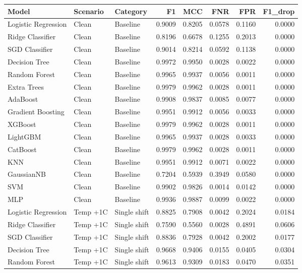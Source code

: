 \begin{tabular}{lllrrrrr}
\toprule
Model & Scenario & Category & F1 & MCC & FNR & FPR & F1\_drop \\
\midrule
Logistic Regression & Clean & Baseline & 0.9009 & 0.8205 & 0.0578 & 0.1160 & 0.0000 \\
Ridge Classifier & Clean & Baseline & 0.8196 & 0.6678 & 0.1255 & 0.2013 & 0.0000 \\
SGD Classifier & Clean & Baseline & 0.9014 & 0.8214 & 0.0592 & 0.1138 & 0.0000 \\
Decision Tree & Clean & Baseline & 0.9972 & 0.9950 & 0.0028 & 0.0022 & 0.0000 \\
Random Forest & Clean & Baseline & 0.9965 & 0.9937 & 0.0056 & 0.0011 & 0.0000 \\
Extra Trees & Clean & Baseline & 0.9979 & 0.9962 & 0.0028 & 0.0011 & 0.0000 \\
AdaBoost & Clean & Baseline & 0.9908 & 0.9837 & 0.0085 & 0.0077 & 0.0000 \\
Gradient Boosting & Clean & Baseline & 0.9951 & 0.9912 & 0.0056 & 0.0033 & 0.0000 \\
XGBoost & Clean & Baseline & 0.9979 & 0.9962 & 0.0028 & 0.0011 & 0.0000 \\
LightGBM & Clean & Baseline & 0.9965 & 0.9937 & 0.0028 & 0.0033 & 0.0000 \\
CatBoost & Clean & Baseline & 0.9979 & 0.9962 & 0.0028 & 0.0011 & 0.0000 \\
KNN & Clean & Baseline & 0.9951 & 0.9912 & 0.0071 & 0.0022 & 0.0000 \\
GaussianNB & Clean & Baseline & 0.7204 & 0.5939 & 0.3949 & 0.0580 & 0.0000 \\
SVM & Clean & Baseline & 0.9902 & 0.9826 & 0.0014 & 0.0142 & 0.0000 \\
MLP & Clean & Baseline & 0.9936 & 0.9887 & 0.0099 & 0.0022 & 0.0000 \\
Logistic Regression & Temp +1C & Single shift & 0.8825 & 0.7908 & 0.0042 & 0.2024 & 0.0184 \\
Ridge Classifier & Temp +1C & Single shift & 0.7590 & 0.5560 & 0.0028 & 0.4891 & 0.0606 \\
SGD Classifier & Temp +1C & Single shift & 0.8836 & 0.7928 & 0.0042 & 0.2002 & 0.0177 \\
Decision Tree & Temp +1C & Single shift & 0.9668 & 0.9406 & 0.0155 & 0.0405 & 0.0304 \\
Random Forest & Temp +1C & Single shift & 0.9613 & 0.9309 & 0.0183 & 0.0470 & 0.0351 \\

\end{tabular}
